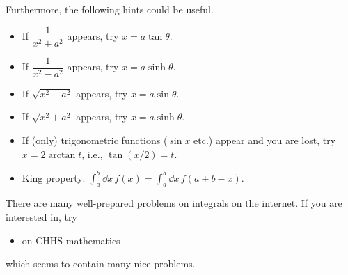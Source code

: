 \documentclass[11pt,pdfa,lastpage]{MishoNote}
\newcommand\incdx[2]{\displaystyle\int_{#1}^{#2}\!\dd x\,}
\begin{document}
Furthermore, the following hints could be useful.
\begin{itemize}
  \item If $\dfrac1{x^2+a^2}$ appears, try $x=a\tan\theta$.
  \item If $\dfrac1{x^2-a^2}$ appears, try $x=a\sinh\theta$.
  \item If $\sqrt{x^2-a^2}$ appears, try $x=a\sin\theta$.
  \item If $\sqrt{x^2+a^2}$ appears, try $x=a\sinh\theta$.
  \item If (only) trigonometric functions ($\sin x$ etc.) appear and you are lost, try $x=2\arctan t$, i.e., $\tan(x/2)=t$.
  \item King property: $\incdx ab f(x)=\incdx abf(a+b-x)$.
\end{itemize}

\vspace{3em}

There are many well-prepared problems on integrals on the internet. If you are interested in, try
\begin{itemize}
  \item \href{https://sites.google.com/view/chhs-math/%E4%B8%8D%E5%AE%9A%E7%A7%AF%E5%88%86/%E7%A7%AF%E5%88%86%E7%BB%83%E4%B9%A0/%E7%A7%AF%E5%88%86100}{\JA{積分100題}} on CHHS mathematics
\end{itemize}
which seems to contain many nice problems.
\end{document}

